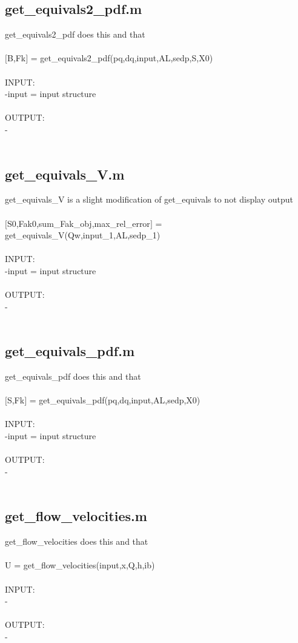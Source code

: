 \subsection{get\_equivals2\_pdf.m}
get\_equivals2\_pdf does this and that \\ 
 \\ 
$[$B,Fk$]$ = get\_equivals2\_pdf(pq,dq,input,AL,sedp,S,X0) \\ 
 \\ 
INPUT: \\ 
   -input = input structure \\ 
 \\ 
OUTPUT: \\ 
   - \\ 
 \\ 
\subsection{get\_equivals\_V.m}
get\_equivals\_V is a slight modification of get\_equivals to not display output \\ 
 \\ 
$[$S0,Fak0,sum\_Fak\_obj,max\_rel\_error$]$ = get\_equivals\_V(Qw,input\_1,AL,sedp\_1) \\ 
 \\ 
INPUT: \\ 
   -input = input structure \\ 
 \\ 
OUTPUT: \\ 
   - \\ 
 \\ 
\subsection{get\_equivals\_pdf.m}
get\_equivals\_pdf does this and that \\ 
 \\ 
$[$S,Fk$]$ = get\_equivals\_pdf(pq,dq,input,AL,sedp,X0) \\ 
 \\ 
INPUT: \\ 
   -input = input structure \\ 
 \\ 
OUTPUT: \\ 
   - \\ 
 \\ 
\subsection{get\_flow\_velocities.m}
get\_flow\_velocities does this and that \\ 
 \\ 
U = get\_flow\_velocities(input,x,Q,h,ib) \\ 
 \\ 
INPUT: \\ 
   - \\ 
 \\ 
OUTPUT: \\ 
   - \\ 
 \\ 
